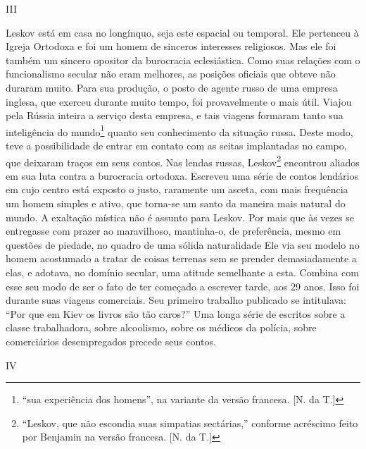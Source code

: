 III

Leskov está em casa no longínquo, seja este espacial ou temporal. Ele
pertenceu à Igreja Ortodoxa e foi um homem de sinceros interesses
religiosos. Mas ele foi também um sincero opositor da burocracia
eclesiástica. Como suas relações com o funcionalismo secular não eram
melhores, as posições oficiais que obteve não duraram muito. Para sua
produção, o posto de agente russo de uma empresa inglesa, que exerceu
durante muito tempo, foi provavelmente o mais útil. Viajou pela Rússia
inteira a serviço desta empresa, e tais viagens formaram tanto sua
inteligência do mundo\footnote{``sua experiência dos homens'', na
  variante da versão francesa. {[}N. da T.{]}} quanto seu conhecimento
da situação russa. Deste modo, teve a possibilidade de entrar em contato
com as seitas implantadas no campo, que deixaram traços em seus contos.
Nas lendas russas, Leskov\footnote{``Leskov, que não escondia suas
  simpatias sectárias,'' conforme acréscimo feito por Benjamin na versão
  francesa. {[}N. da T.{]}} encontrou aliados em sua luta contra a
burocracia ortodoxa. Escreveu uma série de contos lendários em cujo
centro está exposto o justo, raramente um asceta, com mais frequência um
homem simples e ativo, que torna-se um santo da maneira mais natural do
mundo. A exaltação mística não é assunto para Leskov. Por mais que às
vezes se entregasse com prazer ao maravilhoso, mantinha-o, de
preferência, mesmo em questões de piedade, no quadro de uma sólida
naturalidade Ele via seu modelo no homem acostumado a tratar de coisas
terrenas sem se prender demasiadamente a elas, e adotava, no domínio
secular, uma atitude semelhante a esta. Combina com esse seu modo de ser
o fato de ter começado a escrever tarde, aos 29 anos. Isso foi durante
suas viagens comerciais. Seu primeiro trabalho publicado se intitulava:
``Por que em Kiev os livros são tão caros?'' Uma longa série de escritos
sobre a classe trabalhadora, sobre alcoolismo, sobre os médicos da
polícia, sobre comerciários desempregados precede seus contos.

IV

